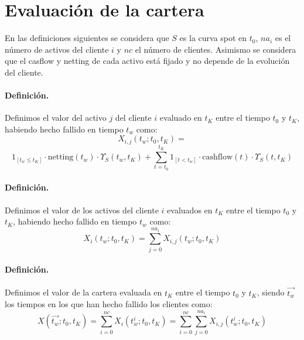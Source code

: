 
\section{Evaluaci\'on de la cartera}

En las definiciones siguientes se considera que $S$ es la curva spot en $t_0$,
$na_i$ es el n\'umero de activos del cliente $i$ y $nc$ el n\'umero de clientes.
Asimismo se considera que el casflow y netting de cada activo est\'a fijado y
no depende de la evoluci\'on del cliente.

\paragraph{Definici\'on.} Definimos el valor del activo $j$ del cliente $i$
evaluado en $t_K$ entre el tiempo $t_0$ y $t_K$, habiendo hecho fallido en
tiempo $t_w$ como:
\begin{equation}
X_{i,j}(t_w;t_0,t_K) = 
\end{equation}
\begin{displaymath}
\textrm{1}_{[t_w \leq t_K]} \cdot \textrm{netting}(t_w) \cdot \Upsilon_S(t_w,t_K) + 
\sum_{t=t_0}^{t_K} \textrm{1}_{[t < t_w]} \cdot \textrm{cashflow}(t) \cdot \Upsilon_S(t,t_K)
\end{displaymath}

\paragraph{Definici\'on.} Definimos el valor de los activos del cliente $i$
evaluados en $t_K$ entre el tiempo $t_0$ y $t_K$, habiendo hecho fallido en
tiempo $t_w$ como:
\begin{equation}
X_i(t_w;t_0,t_K) = \sum_{j=0}^{na_i} X_{i,j}(t_w;t_0,t_K)
\end{equation}

\paragraph{Definici\'on.} Definimos el valor de la cartera evaluada en $t_K$
entre el tiempo $t_0$ y $t_K$, siendo $\vec{t_w}$ los tiempos en los que han hecho
fallido los clientes como:
\begin{equation}
X(\vec{t_w};t_0,t_K) = \sum_{i=0}^{nc} X_i(t_w^i;t_0,t_K) =
\sum_{i=0}^{nc} \sum_{j=0}^{na_i} X_{i,j}(t_w^i;t_0,t_K)
\end{equation}

